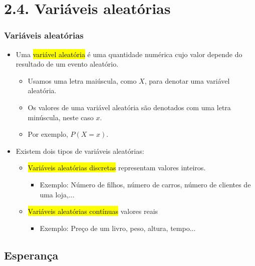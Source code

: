 
\section{2.4. Variáveis aleatórias}


\begin{frame}
\frametitle{Variáveis aleatórias}

\begin{itemize}
\justifying
\item Uma \hl{variável aleatória} é uma quantidade numérica cujo valor depende do resultado de um evento aleatório.
\begin{itemize}
\justifying
\item Usamos uma letra maiúscula, como $ X $, para denotar uma variável aleatória.
\justifying
\item Os valores de uma variável aleatória são denotados com uma letra minúscula, neste caso $ x $.
\justifying
\item Por exemplo, $P(X = x)$.
\end{itemize}
\justifying
\item Existem dois tipos de variáveis aleatórias:
\begin{itemize}
\justifying
\item \hl{Variáveis aleatórias discretas} representam valores inteiros.
\begin{itemize}
\justifying
\item Exemplo: Número de filhos, número de carros, número de clientes de uma loja,...
\end{itemize}
\justifying
\item \hl{Variáveis aleatórias contínuas} valores reais
\begin{itemize}
\justifying
\item Exemplo: Preço de um livro, peso, altura, tempo...
\end{itemize}
\end{itemize}

\end{itemize}

\end{frame}


\subsection{Esperança}

